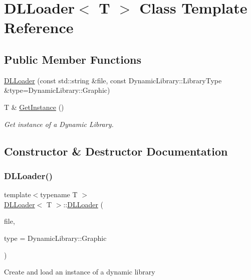 \hypertarget{class_d_l_loader}{}\section{D\+L\+Loader$<$ T $>$ Class Template Reference}
\label{class_d_l_loader}
\subsection*{Public Member Functions}
\begin{DoxyCompactItemize}
\item 
\hyperlink{class_d_l_loader_ad4c7aee282549ba7064d3b539b9dca68}{D\+L\+Loader} (const std\+::string \&file, const Dynamic\+Library\+::\+Library\+Type \&type=Dynamic\+Library\+::\+Graphic)
\item 
T \& \hyperlink{class_d_l_loader_a7a023d81af75b962bddcef178b92e4c4}{Get\+Instance} ()
\begin{DoxyCompactList}\small\item\em Get instance of a Dynamic Library. \end{DoxyCompactList}\end{DoxyCompactItemize}


\subsection{Constructor \& Destructor Documentation}
\mbox{\label{class_d_l_loader_ad4c7aee282549ba7064d3b539b9dca68}} 
\subsubsection{\texorpdfstring{D\+L\+Loader()}{DLLoader()}}
{\footnotesize\ttfamily template$<$typename T $>$ \\
\hyperlink{class_d_l_loader}{D\+L\+Loader}$<$ T $>$\+::\hyperlink{class_d_l_loader}{D\+L\+Loader} (\begin{DoxyParamCaption}\item[{const std\+::string \&}]{file,  }\item[{const Dynamic\+Library\+::\+Library\+Type \&}]{type = {\ttfamily DynamicLibrary\+:\+:Graphic} }\end{DoxyParamCaption})}

Create and load an instance of a dynamic library


